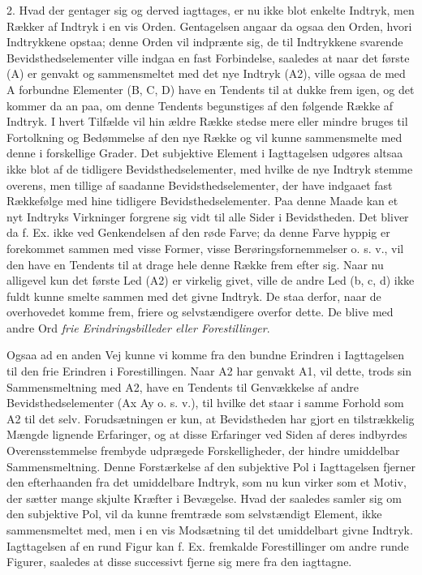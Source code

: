 \documentclass[12pt,a4paper,openany]{book}
\newcommand{\opage}[1]{\marginnote{\footnotesize\textit{[#1]}}}
\begin{document}
2. Hvad der gentager sig og derved iagttages, er nu ikke blot enkelte
Indtryk, men Rækker af Indtryk i en vis Orden. Gentagelsen angaar da
ogsaa den Orden, hvori Indtrykkene opstaa; denne Orden vil indprænte
sig, de til Indtrykkene svarende Bevidsthedselementer ville indgaa en
fast Forbindelse, saaledes at naar det første (A) er genvakt og
sammensmeltet med det nye Indtryk (A2), ville ogsaa de med A forbundne
Elementer (B, C, D) have en Tendents til at dukke frem igen, og det
kommer da an paa, om denne Tendents begunstiges af den følgende Række af
Indtryk. I hvert Tilfælde vil hin ældre Række stedse mere eller mindre
bruges til Fortolkning og Bedømmelse af den nye Række og vil kunne
sammensmelte med denne i forskellige Grader. Det subjektive Element i
Iagttagelsen udgøres altsaa ikke blot af de tidligere
Bevidsthedselementer, med hvilke de nye Indtryk stemme overens, men
tillige af saadanne Bevidsthedselementer, der have indgaaet fast
Rækkefølge med hine tidligere Bevidsthedselementer. Paa denne Maade kan
et nyt Indtryks Virkninger forgrene sig vidt til alle Sider i
Bevidstheden. Det bliver da f. Ex. ikke ved Genkendelsen af den røde
Farve; da denne Farve hyppig er forekommet sammen med visse Former,
visse Berøringsfornemmelser o. s. v., vil den have en Tendents til at
drage hele denne Række frem efter sig. Naar nu alligevel kun det første
Led (A2) er virkelig givet, ville de andre Led (b, c, d) ikke fuldt
kunne smelte sammen med det givne Indtryk. De staa derfor, naar de
overhovedet komme frem, friere og selvstændigere overfor dette. De blive
med andre Ord \emph{frie Erindringsbilleder eller Forestillinger}.

Ogsaa ad en anden Vej kunne vi komme fra den bundne Erindren i
Iagttagelsen til den frie Erindren i Forestillingen. Naar A2 har genvakt
A1, vil dette, trods sin Sammensmeltning med A2, have en Tendents til
Genvækkelse af andre Bevidsthedselementer (Ax Ay o. s. v.), til hvilke
det staar i samme Forhold som A2 til det selv. Forudsætningen er kun, at
Bevidstheden har gjort en tilstrækkelig Mængde lignende Erfaringer, og
at disse Erfaringer ved Siden af deres indbyrdes Overensstemmelse
frembyde udprægede Forskelligheder, der
\opage{156}hindre umiddelbar Sammensmeltning. Denne Forstærkelse af den
subjektive Pol i Iagttagelsen fjerner den efterhaanden fra det
umiddelbare Indtryk, som nu kun virker som et Motiv, der sætter mange
skjulte Kræfter i Bevægelse. Hvad der saaledes samler sig om den
subjektive Pol, vil da kunne fremtræde som selvstændigt Element, ikke
sammensmeltet med, men i en vis Modsætning til det umiddelbart givne
Indtryk. Iagttagelsen af en rund Figur kan f. Ex. fremkalde
Forestillinger om andre runde Figurer, saaledes at disse successivt
fjerne sig mere fra den iagttagne.
\end{document}
